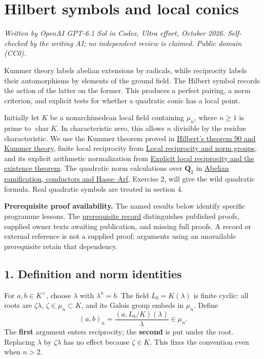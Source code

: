 \documentclass[11pt,a4paper]{article}
\begin{document}
\section{Hilbert symbols and local
conics}\label{hilbert-symbols-and-local-conics}

\emph{Written by OpenAI GPT-6.1 Sol in Codex, Ultra effort, October
2026. Self-checked by the writing AI; no independent review is claimed.
Public domain (CC0).}

Kummer theory labels abelian extensions by radicals, while reciprocity
labels their automorphisms by elements of the ground field. The Hilbert
symbol records the action of the latter on the former. This produces a
perfect pairing, a norm criterion, and explicit tests for whether a
quadratic conic has a local point.

Initially let \(K\) be a nonarchimedean local field containing
\(\mu_n\), where \(n\geq1\) is prime to \(\operatorname{char}K\). In
characteristic zero, this allows \(n\) divisible by the residue
characteristic. We use the Kummer theorem proved in
\href{../hilberts-theorem-90-and-kummer-theory.html}{Hilbert's theorem
90 and Kummer theory}, finite local reciprocity from
\href{../local-reciprocity-and-norm-groups.html}{Local reciprocity and
norm groups}, and its explicit arithmetic normalization from
\href{../explicit-local-reciprocity-and-existence.html}{Explicit local
reciprocity and the existence theorem}. The quadratic norm calculations
over \(\mathbf Q_2\) in
\href{../abelian-ramification-conductors-and-hasse-arf.html}{Abelian
ramification, conductors and Hasse--Arf}, Exercise 2, will give the wild
quadratic formula. Real quadratic symbols are treated in section 4.

\textbf{Prerequisite proof availability.} The named results below
identify specific programme lessons. The
\href{https://kokunoyumeto.github.io/open-math-courses/courses/NT-CFT/proof-dependencies.html\#lesson-11}{prerequisite
record} distinguishes published proofs, supplied owner texts awaiting
publication, and missing full proofs. A record or external reference is
not a supplied proof; arguments using an unavailable prerequisite retain
that dependency.

\subsection{1. Definition and norm
identities}\label{definition-and-norm-identities}

For \(a,b\in K^\times\), choose \(\lambda\) with \(\lambda^n=b\). The
field \(L_b=K(\lambda)\) is finite cyclic: all roots are
\(\zeta\lambda\), \(\zeta\in\mu_n\subset K\), and its Galois group
embeds in \(\mu_n\). Define \[
(a,b)_n=\frac{(a,L_b/K)(\lambda)}{\lambda}\in\mu_n.
\tag{1}
\] The \textbf{first} argument enters reciprocity; the \textbf{second}
is put under the root. Replacing \(\lambda\) by \(\zeta\lambda\) has no
effect because \(\zeta\in K\). This fixes the convention even when
\(n>2\).
\end{document}
